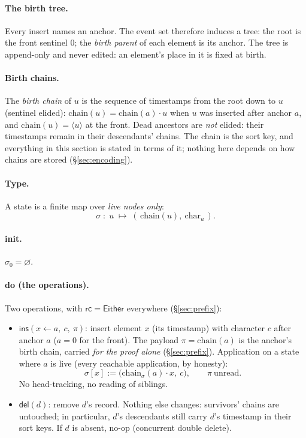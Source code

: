 \documentclass[11pt]{article}
\newcommand{\rcrel}{\mathsf{rc}}                 %
\newcommand{\del}{\mathsf{del}}
\newcommand{\ins}{\mathsf{ins}}
\newcommand{\Either}{\textsf{Either}}
\newcommand{\chain}{\mathrm{chain}}
\begin{document}
\paragraph{The birth tree.} Every insert names an anchor. The event
set therefore induces a tree: the root is the front sentinel $0$; the
\emph{birth parent} of each element is its anchor. The tree is
append-only and never edited: an element's place in it is fixed at
birth.

\paragraph{Birth chains.} The \emph{birth chain} of $u$ is the
sequence of timestamps from the root down to $u$ (sentinel elided):
$\chain(u) = \chain(a) \cdot u$ when $u$ was inserted after anchor
$a$, and $\chain(u) = \langle u \rangle$ at the front. Dead ancestors
are \emph{not} elided: their timestamps remain in their descendants'
chains. The chain is the sort key, and everything in this section is
stated in terms of it; nothing here depends on how chains are stored
(\S\ref{sec:encoding}).

\paragraph{Type.} A state is a finite map over \emph{live nodes only}:
\[
  \sigma \;:\; u \;\mapsto\; (\,\chain(u),\ \mathrm{char}_u\,).
\]

\paragraph{init.} $\sigma_0 = \varnothing$.

\paragraph{do (the operations).} Two operations, with $\rcrel = \Either$
everywhere (\S\ref{sec:prefix}):
\begin{itemize}
\item $\ins(x \leftarrow a,\ c,\ \pi)$: insert element $x$ (its
timestamp) with character $c$ after anchor $a$ ($a = 0$ for the
front). The payload $\pi = \chain(a)$ is the anchor's birth chain,
carried \emph{for the proof alone} (\S\ref{sec:prefix}). Application
on a state where $a$ is live (every reachable application, by
honesty):
\[
  \sigma[x] := \bigl(\chain_\sigma(a) \cdot x,\ c\bigr),
  \qquad \pi\ \text{unread}.
\]
No head-tracking, no reading of siblings.
\item $\del(d)$: remove $d$'s record. Nothing else changes:
survivors' chains are untouched; in particular, $d$'s descendants
still carry $d$'s timestamp in their sort keys. If $d$ is absent,
no-op (concurrent double delete).
\end{itemize}
\end{document}
